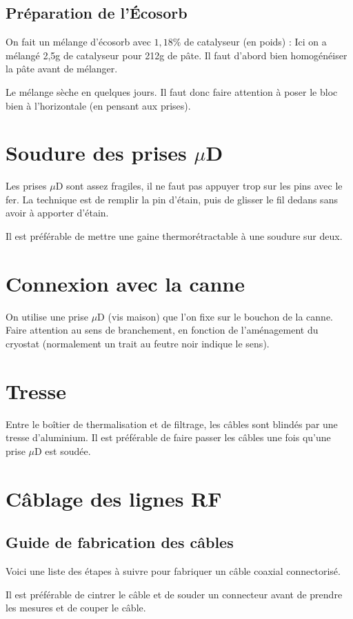 \documentclass[a4paper,11pt]{article}
\newcommand{\uD}{$\mu$D }
\begin{document}
\subsection{Préparation de l'Écosorb}
On fait un mélange d'écosorb avec $1,18\%$ de catalyseur (en poids) : Ici on a mélangé 2,5g de catalyseur pour 212g de pâte. Il faut d'abord bien homogénéiser la pâte avant de mélanger.

Le mélange sèche en quelques jours. Il faut donc faire attention à poser le bloc bien à l'horizontale (en pensant aux prises).

\section{Soudure des prises \uD}
Les prises \uD sont assez fragiles, il ne faut pas appuyer trop sur les pins avec le fer. La technique est de remplir la pin d'étain, puis de glisser le fil dedans sans avoir à apporter d'étain.

Il est préférable de mettre une gaine thermorétractable à une soudure sur deux.

\section{Connexion avec la canne}
On utilise une prise \uD (vis maison) que l'on fixe sur le bouchon de la canne. Faire attention au sens de branchement, en fonction de l'aménagement du cryostat (normalement un trait au feutre noir indique le sens).

\section{Tresse}
Entre le boîtier de thermalisation et de filtrage, les câbles sont blindés par une tresse d'aluminium. Il est préférable de faire passer les câbles une fois qu'une prise \uD est soudée.

\section{Câblage des lignes RF}
\subsection{Guide de fabrication des câbles}
Voici une liste des étapes à suivre pour fabriquer un câble coaxial connectorisé.

Il est préférable de cintrer le câble et de souder un connecteur avant de prendre les mesures et de couper le câble.
\end{document}
